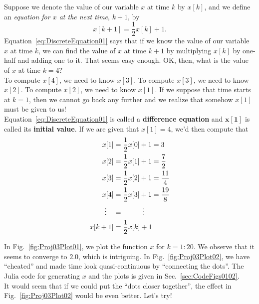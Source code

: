Suppose we denote the value of our variable $x$ at time $k$ by $x[k]$, and we define an \textit{equation for $x$ at the next time}, $k+1$, by
\begin{equation}
    \label{eq:DiscreteEquation01}
    x[k+1]=\frac{1}{2}x[k] + 1.
\end{equation}
Equation~\eqref{eq:DiscreteEquation01} says that if we know the value of our variable $x$ at time $k$, we can find the value of $x$ at time $k+1$ by multiplying $x[k]$ by one-half and adding one to it. That seems easy enough. OK, then, what is the value of $x$ at time $k=4$? \\

To compute $x[4]$, we need to know $x[3]$. To compute $x[3]$, we need to know $x[2]$. To compute $x[2]$, we need to know $x[1]$.  If we suppose that time starts at $k=1$, then we cannot go back any further and we realize that somehow $x[1]$ must be given to us!\\

Equation~\eqref{eq:DiscreteEquation01} is called a \textbf{difference equation} and $\mathbf{x[1]}$ is called its \textbf{initial value}. If we are given that $x[1]=4$, we'd then compute that
\begin{align*}
    x[1]&=\frac{1}{2}x[0] + 1 = 3\\
     x[2]&=\frac{1}{2}x[1] + 1 = \frac{7}{2}\\
     x[3]&=\frac{1}{2}x[2] + 1 = \frac{11}{4}\\
     x[4]&=\frac{1}{2}x[3] + 1 = \frac{19}{8}\\
     \vdots~~~&= \hspace*{1cm} \vdots\\
     x[k+1]&= \frac{1}{2}x[k] + 1
\end{align*}

In Fig.~\ref{fig:Proj03Plot01}, we plot the function $x$ for $k=1:20$. We observe that it seems to converge to $2.0$, which is intriguing. In Fig.~\ref{fig:Proj03Plot02}, we have ``cheated'' and made time look quasi-continuous by ``connecting the dots''. The Julia code for generating $x$ and the plots is given in Sec.~\ref{sec:CodeFigs0102}.\\

It would seem that if we could put the ``dots closer together'', the effect in Fig.~\ref{fig:Proj03Plot02} would be even better. Let's try! \\

